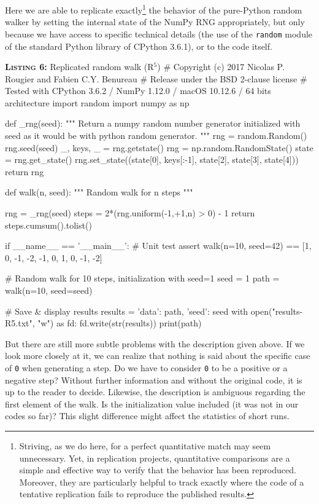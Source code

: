 \documentclass[a4paper,11pt]{article}
\begin{document}
Here we are able to replicate exactly\footnote{Striving, as we do here, for a perfect quantitative match may seem unnecessary. Yet, in replication projects, quantitative comparisons are a simple and effective way to verify that the behavior has been reproduced. Moreover, they are particularly helpful to track exactly where the code of a tentative replication fails to reproduce the published results.} the behavior of the pure-Python random walker by setting the internal state of the NumPy RNG appropriately, but only because we have access to specific technical details (the use of the {\tt random} module of the standard Python library of CPython 3.6.1), or to the code itself.\\

\noindent \begin{minipage}[c]{\linewidth}
\begin{code}{\textbf{\textsc{Listing 6:}} Replicated random walk (R$^5$)}
# Copyright (c) 2017 Nicolas P. Rougier and Fabien C.Y. Benureau
# Release under the BSD 2-clause license
# Tested with CPython 3.6.2 / NumPy 1.12.0 / macOS 10.12.6 / 64 bits architecture
import random
import numpy as np

def _rng(seed):
    """ Return a numpy random number generator initialized with seed
        as it would be with python random generator.
    """
    rng = random.Random()
    rng.seed(seed)
    _, keys, _ = rng.getstate()
    rng = np.random.RandomState()
    state = rng.get_state()
    rng.set_state((state[0], keys[:-1], state[2], state[3], state[4]))
    return rng

def walk(n, seed):
    """ Random walk for n steps """

    rng = _rng(seed)
    steps = 2*(rng.uniform(-1,+1,n) > 0) - 1
    return steps.cumsum().tolist()

if __name__ == '__main__':
    # Unit test
    assert walk(n=10, seed=42) == [1, 0, -1, -2, -1, 0, 1, 0, -1, -2]

    # Random walk for 10 steps, initialization with seed=1
    seed = 1
    path = walk(n=10, seed=seed)

    # Save & display results
    results = {'data': path, 'seed': seed}
    with open("results-R5.txt", "w") as fd:
        fd.write(str(results))
    print(path)
\end{code}
\end{minipage}

But there are still more subtle problems with the description given above.
If we look more closely at it, we can realize
that nothing is said about the specific case of {\tt 0} when generating a step.
Do we have to consider {\tt 0} to be a positive or a negative step? Without
further information and without the original code, it is up to the reader to
decide. Likewise, the description is ambiguous regarding the first element of the walk. Is the initialization value included (it was not in our codes so far)? This slight difference might affect the statistics of short runs.\\
\end{document}
